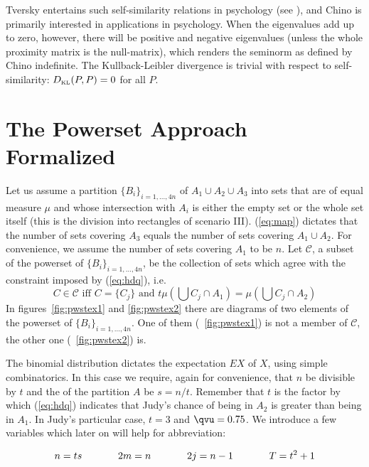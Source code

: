\documentclass[phd,12pt,oneside]{ubcthesis}
\begin{document}
Tversky entertains such self-similarity relations in psychology (see
), and Chino is primarily interested in
applications in psychology. When the eigenvalues add up to zero,
however, there will be positive and negative eigenvalues (unless the
whole proximity matrix is the null-matrix), which renders the seminorm
as defined by Chino indefinite. The Kullback-Leibler divergence is
trivial with respect to self-similarity: $D_{\mbox{\tiny KL}}(P,P)=0$
for all $P$.

\chapter{The Powerset Approach Formalized}
\label{app:kiiwivul}

Let us assume a partition $\{B_{i}\}_{i=1,{\ldots},4n}$ of
$A_{1}\cup{}A_{2}\cup{}A_{3}$ into sets that are of equal measure
$\mu$ and whose intersection with $A_{i}$ is either the empty set or
the whole set itself (this is the division into rectangles of scenario
III). ({\ref{eq:map}}) dictates that the number of sets covering
$A_{3}$ equals the number of sets covering $A_{1}\cup{}A_{2}$. For
convenience, we assume the number of sets covering $A_{1}$ to be $n$.
Let $\mathcal{C}$, a subset of the powerset of
$\{B_{i}\}_{i=1,{\ldots},4n}$, be the collection of sets which agree
with the constraint imposed by ({\ref{eq:hdq}}), i.e.\
\begin{equation}
  \label{eq:iengiebu}
  C\in\mathcal{C}\mbox{ iff }C=\{C_{j}\}\mbox{ and }t\mu\left(\bigcup{}C_{j}\cap{}A_{1}\right)=\mu\left(\bigcup{}C_{j}\cap{}A_{2}\right)
\end{equation}
In figures~\ref{fig:pwstex1} and \ref{fig:pwstex2} there are diagrams
of two elements of the powerset of $\{B_{i}\}_{i=1,{\ldots},4n}$. One
of them ({\igure}~\ref{fig:pwstex1}) is not a member of $\mathcal{C}$,
the other one ({\igure}~\ref{fig:pwstex2}) is.

The binomial distribution dictates the expectation $EX$ of $X$, using
simple combinatorics. In this case we require, again for convenience,
that $n$ be divisible by $t$ and the \qnull{grain} of the partition
$A$ be $s=n/t$. Remember that $t$ is the factor by which
({\ref{eq:hdq}}) indicates that Judy's chance of being in $A_{2}$ is
greater than being in $A_{1}$. In Judy's particular case, $t=3$ and
${\qvu}=0.75$. We introduce a few variables which later on will help
for abbreviation:

\begin{equation}
  \label{eq:naibepha}
n=ts\hspace{.5in}
2m=n\hspace{.5in}
2j=n-1\hspace{.5in}
{T}=t^{2}+1
\end{equation}
\end{document}
